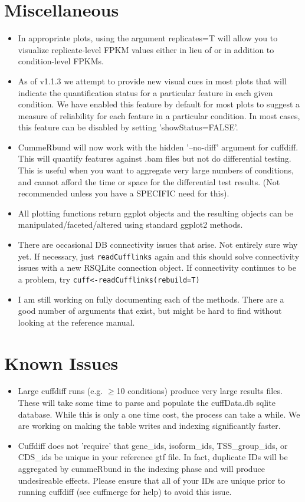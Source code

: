 \documentclass[10pt]{article}
\newcommand{\Rfunction}[1]{\texttt{#1}}
\begin{document}
\section{Miscellaneous}
\begin{itemize}
	\item In appropriate plots, using the argument replicates=T will allow you to visualize replicate-level FPKM values either in lieu of or in addition to condition-level FPKMs.
	\item As of v1.1.3 we attempt to provide new visual cues in most plots that will indicate the quantification status for a particular feature in each given condition. We have enabled this feature by default for most
	plots to suggest a measure of reliability for each feature in a particular condition. In most cases, this feature can be disabled by setting 'showStatus=FALSE'.
	\item CummeRbund will now work with the hidden '--no-diff' argument for cuffdiff.  This will quantify features against .bam files but not do differential testing.  This is useful when you want to aggregate very large numbers
	of conditions, and cannot afford the time or space for the differential test results. (Not recommended unless you have a SPECIFIC need for this).
	\item All plotting functions return ggplot objects and the resulting objects can be manipulated/faceted/altered using standard ggplot2 methods.
	\item There are occasional DB connectivity issues that arise.  Not entirely sure why yet.  If necessary, just \Rfunction{readCufflinks} again and this should solve connectivity issues with a new
	RSQLite connection object.  If connectivity continues to be a problem, try \Rfunction{cuff<-readCufflinks(rebuild=T)}
	\item I am still working on fully documenting each of the methods.  There are a good number of arguments that exist, but might be hard to find without looking at the reference manual.
\end{itemize}

\clearpage

\section{Known Issues}
\begin{itemize}
	\item Large cuffdiff runs (e.g. $\ge$10 conditions) produce very large results files.  These will take some time to parse and populate the cuffData.db sqlite database.  While this is only a one time cost, the process can take a while. We are working on making the table writes and indexing significantly faster.
	\item Cuffdiff does not 'require' that gene\_ids, isoform\_ids, TSS\_group\_ids, or CDS\_ids be unique in your reference gtf file. In fact, duplicate IDs will be aggregated by cummeRbund in the indexing phase and will produce undesireable effects. Please ensure that all of your IDs are unique prior to running cuffdiff (see cuffmerge for help) to avoid this issue.
\end{itemize}
\end{document}
